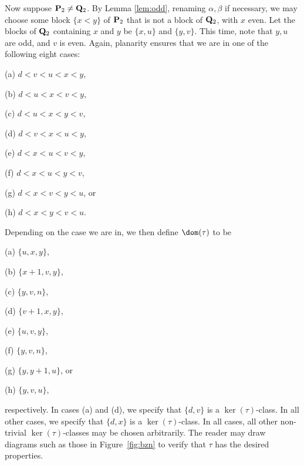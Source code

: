 \bigskip{}  Now suppose ${\bf P}_2\not={\bf Q}_2$.  By Lemma \ref{lem:odd}, renaming $\alpha,\beta$ if necessary, we may choose some block $\{x<y\}$ of ${\bf P}_2$ that is not a block of ${\bf Q}_2$, with $x$ even.  Let the blocks of ${\bf Q}_2$ containing $x$ and $y$ be $\{x,u\}$ and $\{y,v\}$.  This time, note that $y,u$ are odd, and $v$ is even.  Again, planarity ensures that we are in one of the following eight cases:
\begin{itemize}
\begin{multicols}{4}
\item[(a)] $d<v<u<x<y$,
\item[(b)] $d<u<x<v<y$,
\item[(c)] $d<u<x<y<v$,
\item[(d)] $d<v<x<u<y$,
\item[(e)] $d<x<u<v<y$,
\item[(f)] $d<x<u<y<v$, 
\item[(g)] $d<x<v<y<u$, or
\item[(h)] $d<x<y<v<u$.
\end{multicols}
\end{itemize}
Depending on the case we are in, we then define $\dom(\tau)$ to be
\begin{itemize}
\begin{multicols}{4}
\item[(a)] $\{u,x,y\}$,
\item[(b)] $\{x+1,v,y\}$,
\item[(c)] $\{y,v,n\}$,
\item[(d)] $\{v+1,x,y\}$, 
\item[(e)] $\{u,v,y\}$,
\item[(f)] $\{y,v,n\}$, 
\item[(g)] $\{y,y+1,u\}$, or
\item[(h)] $\{y,v,u\}$,
\end{multicols}
\end{itemize}
respectively.
In cases (a) and (d), we specify that $\{d,v\}$ is a $\ker(\tau)$-class.  In all other cases, we specify that $\{d,x\}$ is a $\ker(\tau)$-class.  In all cases, all other non-trivial $\ker(\tau)$-classes may be chosen arbitrarily.  The reader may draw diagrams such as those in Figure~\ref{fig:bzn} to verify that $\tau$ has the desired properties. \epf








